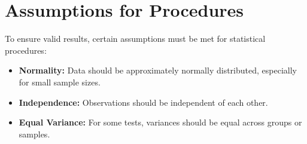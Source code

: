 \documentclass{article}
\begin{document}
\section{Assumptions for Procedures}
To ensure valid results, certain assumptions must be met for statistical procedures:

\begin{itemize}
    \item \textbf{Normality:} Data should be approximately normally distributed, especially for small sample sizes.
    \item \textbf{Independence:} Observations should be independent of each other.
    \item \textbf{Equal Variance:} For some tests, variances should be equal across groups or samples.
\end{itemize}
\end{document}
